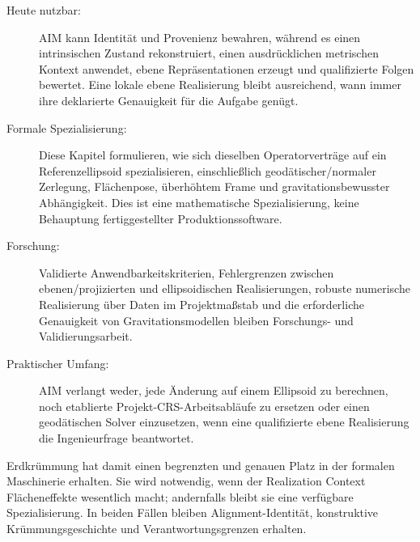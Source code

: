 \begin{description}
\item[Heute nutzbar:] AIM kann Identität und Provenienz bewahren, während es
  einen intrinsischen Zustand rekonstruiert, einen ausdrücklichen metrischen
  Kontext anwendet, ebene Repräsentationen erzeugt und qualifizierte Folgen
  bewertet. Eine lokale ebene Realisierung bleibt ausreichend, wann immer
  ihre deklarierte Genauigkeit für die Aufgabe genügt.
\item[Formale Spezialisierung:] Diese Kapitel formulieren, wie sich dieselben
  Operatorverträge auf ein Referenzellipsoid spezialisieren, einschließlich
  geodätischer/normaler Zerlegung, Flächenpose, überhöhtem Frame und
  gravitationsbewusster Abhängigkeit. Dies ist eine mathematische
  Spezialisierung, keine Behauptung fertiggestellter Produktionssoftware.
\item[Forschung:] Validierte Anwendbarkeitskriterien, Fehlergrenzen zwischen
  ebenen/projizierten und ellipsoidischen Realisierungen, robuste numerische
  Realisierung über Daten im Projektmaßstab und die erforderliche Genauigkeit
  von Gravitationsmodellen bleiben Forschungs- und Validierungsarbeit.
\item[Praktischer Umfang:] AIM verlangt weder, jede Änderung auf einem
  Ellipsoid zu berechnen, noch etablierte Projekt-CRS-Arbeitsabläufe zu
  ersetzen oder einen geodätischen Solver einzusetzen, wenn eine qualifizierte
  ebene Realisierung die Ingenieurfrage beantwortet.
\end{description}

Erdkrümmung hat damit einen begrenzten und genauen Platz in der formalen
Maschinerie erhalten. Sie wird notwendig, wenn der Realization Context
Flächeneffekte wesentlich macht; andernfalls bleibt sie eine verfügbare
Spezialisierung. In beiden Fällen bleiben Alignment-Identität, konstruktive
Krümmungsgeschichte und Verantwortungsgrenzen erhalten.
